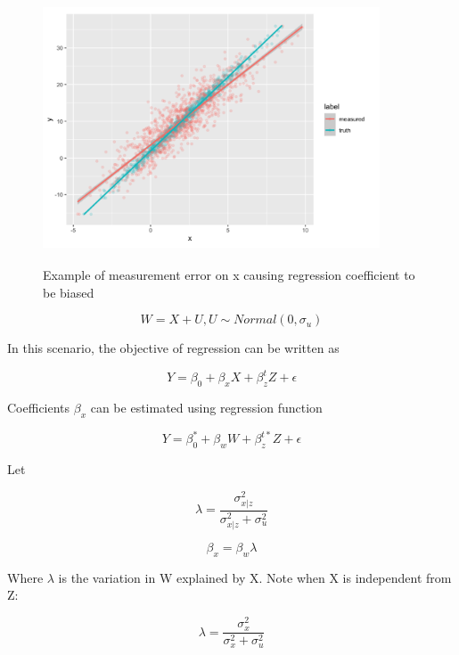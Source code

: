 \documentclass{article}
\begin{document}
\begin{figure}[h]
\centering
\includegraphics[width = 10cm,height = 8cm]{figure-1.png}
\caption{Example of measurement error on x causing regression coefficient to be biased}
\label{fig1}
\end{figure}


\begin{equation}
W = X + U, U \sim Normal(0, \sigma_u)
\end{equation}

In this scenario, the objective of regression can be written as

\begin{equation}
Y = \beta_0 + \beta_x  X + \beta_{z}^t Z + \epsilon
\end{equation}

Coefficients $\beta_x$ can be estimated using regression function

\begin{equation}
Y = \beta_0^* + \beta_{w}  W + \beta_{z}^{t*} Z + \epsilon
\end{equation}

Let 

\begin{equation}
\lambda = \frac{\sigma_{x|z}^2}{\sigma_{x|z}^2 + \sigma_{u}^2}
\end{equation}


\begin{equation}
\beta_x = \beta_{w} \lambda
\end{equation}



Where $\lambda$ is the variation in W explained by X. Note when X is independent from Z:
 
\begin{equation}
\lambda = \frac{\sigma_{x}^2}{\sigma_{x}^2 + \sigma_{u}^2}
\end{equation}
\end{document}
